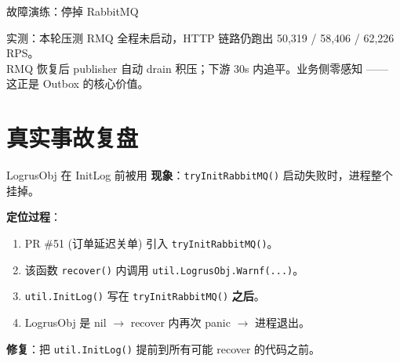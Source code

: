 \begin{frame}{故障演练：停掉 RabbitMQ}
\vspace{2mm}
\small 实测：本轮压测 RMQ 全程未启动，HTTP 链路仍跑出 50{,}319 / 58{,}406 / 62{,}226 RPS。\\
RMQ 恢复后 publisher 自动 drain 积压；下游 30s 内追平。业务侧零感知 —— 这正是 Outbox 的核心价值。
\end{frame}

\section{真实事故复盘}

\begin{frame}{LogrusObj 在 InitLog 前被用}
\textbf{现象}：\texttt{tryInitRabbitMQ()} 启动失败时，进程整个挂掉。

\vspace{2mm}
\textbf{定位过程}：
\begin{enumerate}
  \item PR \#51 (订单延迟关单) 引入 \texttt{tryInitRabbitMQ()}。
  \item 该函数 \texttt{recover()} 内调用 \texttt{util.LogrusObj.Warnf(...)}。
  \item \texttt{util.InitLog()} 写在 \texttt{tryInitRabbitMQ()} \textbf{之后}。
  \item LogrusObj 是 nil $\to$ recover 内再次 panic $\to$ 进程退出。
\end{enumerate}
\vspace{2mm}
\textbf{修复}：把 \texttt{util.InitLog()} 提前到所有可能 recover 的代码之前。
\end{frame}

